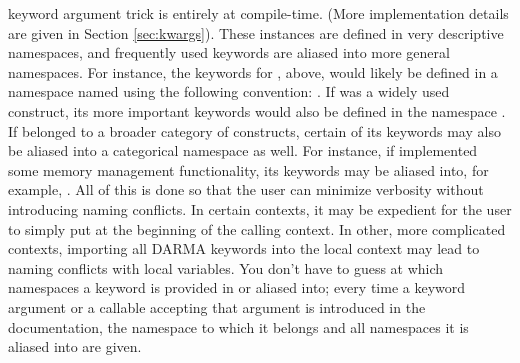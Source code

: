 \gls{keyword argument}
trick is entirely at compile-time.  (More implementation details are given in
Section \ref{sec:kwargs}).  These instances are defined in very descriptive namespaces,
and frequently used keywords are aliased into more general namespaces. 
For instance, the keywords for , above, would likely be 
defined in a namespace named using the following convention:
.
If  was a 
widely used construct, its more important keywords would also be defined 
in the namespace . 
If  belonged to a broader category of 
constructs, certain of its keywords may also be aliased into a 
categorical namespace as well.  For instance, if  
implemented some memory management functionality,
its keywords may be aliased into, for example, .
All of this is done so that the user can minimize verbosity without introducing
naming conflicts.  In certain contexts, it may be expedient for the user to simply
put  at the beginning of the calling context. 
In other, more complicated contexts, importing all DARMA keywords into the 
local context may lead to naming conflicts with local variables. 
You don't have to guess at which namespaces
a keyword is provided in or aliased into; every time a \gls{keyword argument} or a callable
accepting that argument is introduced in the documentation, the namespace to which 
it belongs and all namespaces it is aliased into are given.



